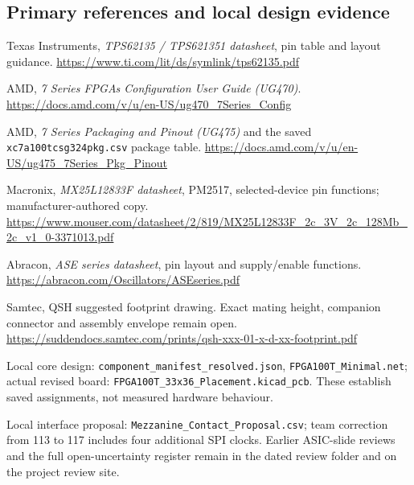 \documentclass[11pt,a4paper]{article}
\begin{document}
\subsection{Primary references and local design evidence}
\begin{enumerate}[label={[\arabic*]},leftmargin=8mm,itemsep=7pt]
\item Texas Instruments, \emph{TPS62135 / TPS621351 datasheet}, pin table and layout guidance. \url{https://www.ti.com/lit/ds/symlink/tps62135.pdf}
\item AMD, \emph{7 Series FPGAs Configuration User Guide (UG470)}. \url{https://docs.amd.com/v/u/en-US/ug470_7Series_Config}
\item AMD, \emph{7 Series Packaging and Pinout (UG475)} and the saved \nolinkurl{xc7a100tcsg324pkg.csv} package table. \url{https://docs.amd.com/v/u/en-US/ug475_7Series_Pkg_Pinout}
\item Macronix, \emph{MX25L12833F datasheet}, PM2517, selected-device pin functions; manufacturer-authored copy. \url{https://www.mouser.com/datasheet/2/819/MX25L12833F_2c_3V_2c_128Mb_2c_v1_0-3371013.pdf}
\item Abracon, \emph{ASE series datasheet}, pin layout and supply/enable functions. \url{https://abracon.com/Oscillators/ASEseries.pdf}
\item Samtec, QSH suggested footprint drawing. Exact mating height, companion connector and assembly envelope remain open. \url{https://suddendocs.samtec.com/prints/qsh-xxx-01-x-d-xx-footprint.pdf}
\item Local core design: \nolinkurl{component_manifest_resolved.json}, \nolinkurl{FPGA100T_Minimal.net}; actual revised board: \nolinkurl{FPGA100T_33x36_Placement.kicad_pcb}. These establish saved assignments, not measured hardware behaviour.
\item Local interface proposal: \nolinkurl{Mezzanine_Contact_Proposal.csv}; team correction from 113 to 117 includes four additional SPI clocks. Earlier ASIC-slide reviews and the full open-uncertainty register remain in the dated review folder and on the project review site.
\end{enumerate}
\end{document}
